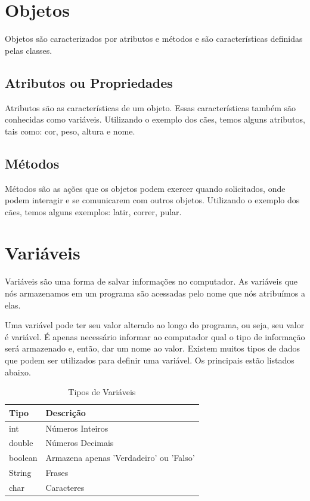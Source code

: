 \documentclass[
]{book}
\begin{document}
\hypertarget{objetos}{%
\section{Objetos}\label{objetos}}

Objetos são caracterizados por atributos e métodos e são características definidas pelas classes.

\hypertarget{atributos-ou-propriedades}{%
\subsection{Atributos ou Propriedades}\label{atributos-ou-propriedades}}

Atributos são as características de um objeto. Essas características também são conhecidas como variáveis. Utilizando o exemplo dos cães, temos alguns atributos, tais como: cor, peso, altura e nome.

\hypertarget{muxe9todos}{%
\subsection{Métodos}\label{muxe9todos}}

Métodos são as ações que os objetos podem exercer quando solicitados, onde podem interagir e se comunicarem com outros objetos. Utilizando o exemplo dos cães, temos alguns exemplos: latir, correr, pular.

\hypertarget{variuxe1veis}{%
\section{Variáveis}\label{variuxe1veis}}

Variáveis são uma forma de salvar informações no computador. As variáveis que nós armazenamos em um programa são acessadas pelo nome que nós atribuímos a elas.

Uma variável pode ter seu valor alterado ao longo do programa, ou seja, seu valor é variável. É apenas necessário informar ao computador qual o tipo de informação será armazenado e, então, dar um nome ao valor. Existem muitos tipos de dados que podem ser utilizados para definir uma variável. Os principais estão listados abaixo.

\begin{table}

\caption{\label{tab:unnamed-chunk-1}Tipos de Variáveis}
\centering
\begin{tabular}[t]{l|l}
\hline
Tipo & Descrição\\
\hline
int & Números Inteiros\\
\hline
double & Números Decimais\\
\hline
boolean & Armazena apenas 'Verdadeiro' ou 'Falso'\\
\hline
String & Frases\\
\hline
char & Caracteres\\
\hline
\end{tabular}
\end{table}
\end{document}
